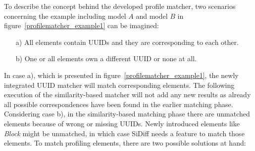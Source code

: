 To describe the concept behind the developed profile matcher, two scenarios
concerning the example including model $A$ and model $B$ in figure~\ref{profilematcher_example1} can be imagined:
\begin{itemize}
  \item[a)] All elements contain \ac{UUID}s and they are corresponding to each other.
  \item[b)] One or all elements own a different \ac{UUID} or none at all.
\end{itemize}
In case a), which is presented in figure~\ref{profilematcher_example1}, the
newly integrated \ac{UUID} matcher will match corresponding elements. The
following execution of the similarity-based matcher will not add any new
results as already all possible correspondences have been found in the earlier
matching phase. Considering case b), in the similarity-based matching phase
there are unmatched elements because of wrong or missing \ac{UUID}s. Newly
introduced elements like \textit{Block} might be unmatched, in which case SiDiff
needs a feature to match those elements. To match profiling elements, there are
two possible solutions at hand:
